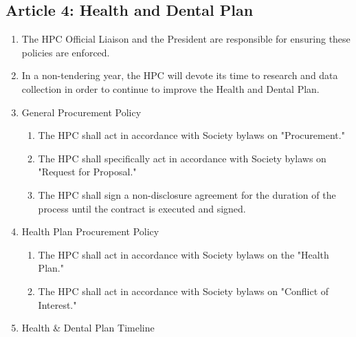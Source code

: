 \subsection{Article 4: Health and Dental Plan}
\begin{enumerate} [label*=\arabic*., align=left]	
\item The HPC Official Liaison and the President are responsible for ensuring these policies are enforced.
\item In a non-tendering year, the HPC will devote its time to research and data collection in order to continue to improve the Health and Dental Plan.
\item General Procurement Policy
\begin{enumerate}[label*=\arabic*., align=left]	
\item The HPC shall act in accordance with Society bylaws on "Procurement."
\item The HPC shall specifically act in accordance with Society bylaws on "Request for Proposal."
\item The HPC shall sign a non-disclosure agreement for the duration of the process until the
contract is executed and signed.
\end{enumerate}
\item Health Plan Procurement Policy
\begin{enumerate} [label*=\arabic*., align=left]	
\item The HPC shall act in accordance with Society bylaws on the "Health Plan."
\item The HPC shall act in accordance with Society bylaws on "Conflict of Interest."
\end{enumerate}
\item Health \& Dental Plan Timeline


\end{enumerate}
